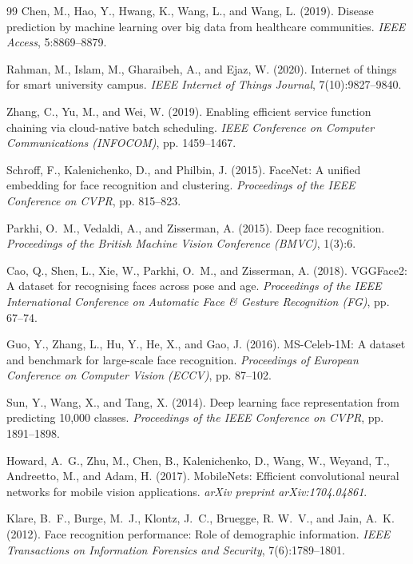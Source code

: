 \documentclass[12pt,a4paper]{report}
\begin{document}
\begin{thebibliography}{99}
Chen, M., Hao, Y., Hwang, K., Wang, L., and Wang, L. (2019).
\newblock Disease prediction by machine learning over big data from healthcare communities.
\newblock \textit{IEEE Access}, 5:8869--8879.

Rahman, M., Islam, M., Gharaibeh, A., and Ejaz, W. (2020).
\newblock Internet of things for smart university campus.
\newblock \textit{IEEE Internet of Things Journal}, 7(10):9827--9840.

Zhang, C., Yu, M., and Wei, W. (2019).
\newblock Enabling efficient service function chaining via cloud-native batch scheduling.
\newblock \textit{IEEE Conference on Computer Communications (INFOCOM)}, pp. 1459--1467.

Schroff, F., Kalenichenko, D., and Philbin, J. (2015).
\newblock FaceNet: A unified embedding for face recognition and clustering.
\newblock \textit{Proceedings of the IEEE Conference on CVPR}, pp. 815--823.

Parkhi, O.~M., Vedaldi, A., and Zisserman, A. (2015).
\newblock Deep face recognition.
\newblock \textit{Proceedings of the British Machine Vision Conference (BMVC)}, 1(3):6.

Cao, Q., Shen, L., Xie, W., Parkhi, O.~M., and Zisserman, A. (2018).
\newblock VGGFace2: A dataset for recognising faces across pose and age.
\newblock \textit{Proceedings of the IEEE International Conference on Automatic Face \& Gesture Recognition (FG)}, pp. 67--74.

Guo, Y., Zhang, L., Hu, Y., He, X., and Gao, J. (2016).
\newblock MS-Celeb-1M: A dataset and benchmark for large-scale face recognition.
\newblock \textit{Proceedings of European Conference on Computer Vision (ECCV)}, pp. 87--102.

Sun, Y., Wang, X., and Tang, X. (2014).
\newblock Deep learning face representation from predicting 10,000 classes.
\newblock \textit{Proceedings of the IEEE Conference on CVPR}, pp. 1891--1898.

Howard, A.~G., Zhu, M., Chen, B., Kalenichenko, D., Wang, W., Weyand, T., Andreetto, M., and Adam, H. (2017).
\newblock MobileNets: Efficient convolutional neural networks for mobile vision applications.
\newblock \textit{arXiv preprint arXiv:1704.04861}.

Klare, B.~F., Burge, M.~J., Klontz, J.~C., Bruegge, R. W.~V., and Jain, A.~K. (2012).
\newblock Face recognition performance: Role of demographic information.
\newblock \textit{IEEE Transactions on Information Forensics and Security}, 7(6):1789--1801.


\end{thebibliography}
\end{document}

